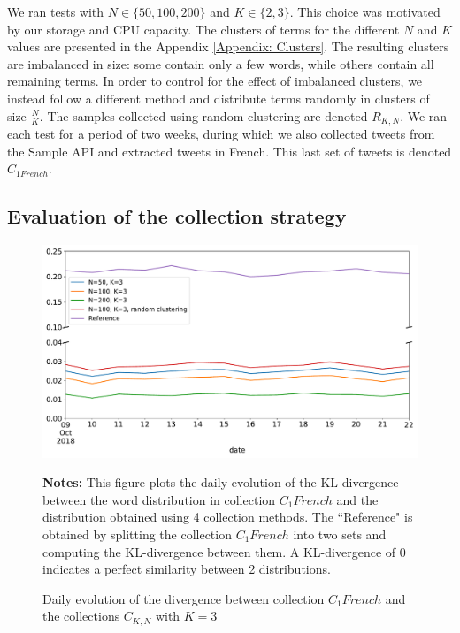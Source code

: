  We ran tests with $N \in \{50, 100, 200\}$ and $K \in \{2,3\}$. This choice was motivated by our storage and CPU capacity. The clusters of terms for the different $N$ and $K$ values are presented in the Appendix \ref{Appendix: Clusters}. The resulting clusters are imbalanced in size: some contain only a few words, while others contain all remaining terms. In order to control for the effect of imbalanced clusters, we instead follow a different method and distribute terms randomly in clusters of size $\frac{N}{K}$. The samples collected using random clustering are denoted $R_{K,N}$. We ran each test for a period of two weeks, during which we also collected tweets from the Sample API and extracted tweets in French. This last set of tweets is denoted $C_{1 French}$.
			
			\subsection{Evaluation of the collection strategy \label{SubSec: evaluation_of_collection}}
			
\begin{figure}
\begin{center}
\includegraphics[scale=.5]{figures/KL_K=3.pdf}
\end{center}
{\scriptsize \textbf{Notes:} This figure plots the daily evolution of the KL-divergence between the word distribution in collection $C_1 French$ and the distribution obtained using 4 collection methods. The ``Reference" is obtained by splitting the collection $C_1 French$ into two sets and computing the KL-divergence between them. A KL-divergence of 0 indicates a perfect similarity between 2 distributions.}
\caption{Daily evolution of the divergence between collection $C_1 French$ and the collections $C_{K,N}$ with $K = 3$}
\label{Figure:KL_K=3}
\end{figure}

